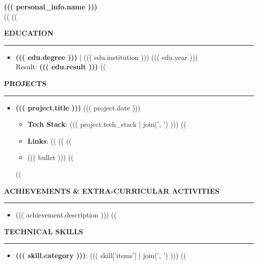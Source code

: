 \documentclass[10pt]{article}
\newcommand{\resheading}[1]{\vspace{8pt} \noindent \textbf{\large\scshape{#1}} \vspace{4pt} \hrule \vspace{6pt}}
\begin{document}
\begin{center}
    \textbf{\Large{((( personal_info.name )))}} \\ \vspace{0.4em}
    ((%
    ((%
\end{center}

\resheading{EDUCATION}
\begin{itemize}[leftmargin=*]
((%
\item \textbf{((( edu.degree )))} | ((( edu.institution ))) \hfill ((( edu.year ))) \\
      Result: \textbf{((( edu.result )))}
((%
\end{itemize}

\resheading{PROJECTS}
\begin{itemize}[leftmargin=*]
((%
\item \textbf{((( project.title )))} \hfill ((( project.date )))
    \begin{itemize}[noitemsep, topsep=2pt]
        \item \textbf{Tech Stack}: ((( project.tech_stack | join(', ') )))
        ((%
        \item \textbf{Links}: ((%
        ((%
        ((%
        \item ((( bullet )))
        ((%
    \end{itemize}
((%
\end{itemize}

\resheading{ACHIEVEMENTS \& EXTRA-CURRICULAR ACTIVITIES}
\begin{itemize}[leftmargin=*]
((%
\item ((( achievement.description )))
((%
\end{itemize}

\resheading{TECHNICAL SKILLS}
\begin{itemize}[leftmargin=*]
((%
\item \textbf{((( skill.category )))}: ((( skill['items'] | join(', ') )))
((%
\end{itemize}
\end{document}
